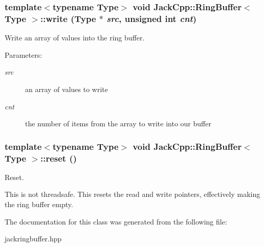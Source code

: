 \subsubsection[write]{\setlength{\rightskip}{0pt plus 5cm}template$<$typename Type$>$ void {\bf JackCpp::RingBuffer}$<$ Type $>$::write (Type $\ast$ {\em src}, \/  unsigned int {\em cnt})\hspace{0.3cm}{\tt  [inline]}}\label{classJackCpp_1_1RingBuffer_5527e5fe0b2a1045981c790f4abf9c03}


Write an array of values into the ring buffer. 

\begin{Desc}
\item[Parameters:]
\begin{description}
\item[{\em src}]an array of values to write \item[{\em cnt}]the number of items from the array to write into our buffer \end{description}
\end{Desc}
\subsubsection[reset]{\setlength{\rightskip}{0pt plus 5cm}template$<$typename Type$>$ void {\bf JackCpp::RingBuffer}$<$ Type $>$::reset ()\hspace{0.3cm}{\tt  [inline]}}\label{classJackCpp_1_1RingBuffer_150c7e85f5a2764e4a7a59de20783469}


Reset. 

This is not threadsafe. This resets the read and write pointers, effectively making the ring buffer empty. 

The documentation for this class was generated from the following file:\begin{CompactItemize}
\item 
jackringbuffer.hpp\end{CompactItemize}
